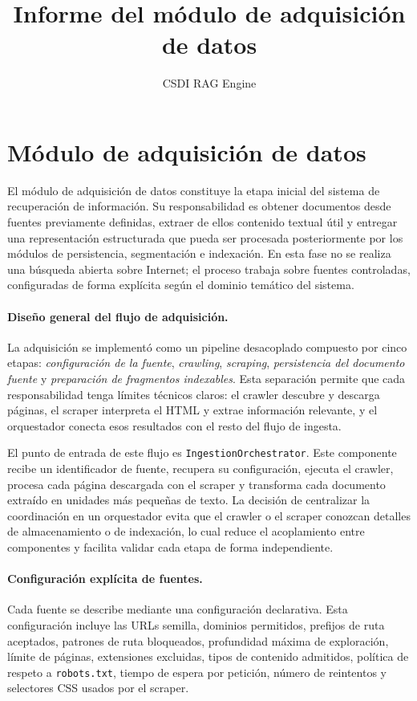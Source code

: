 \documentclass[11pt]{article}
\title{Informe del módulo de adquisición de datos}
\author{CSDI RAG Engine}
\date{}
\begin{document}
\maketitle

\section{Módulo de adquisición de datos}

El módulo de adquisición de datos constituye la etapa inicial del sistema de recuperación de
información. Su responsabilidad es obtener documentos desde fuentes previamente definidas,
extraer de ellos contenido textual útil y entregar una representación estructurada que pueda ser
procesada posteriormente por los módulos de persistencia, segmentación e indexación. En esta
fase no se realiza una búsqueda abierta sobre Internet; el proceso trabaja sobre fuentes
controladas, configuradas de forma explícita según el dominio temático del sistema.

\paragraph{Diseño general del flujo de adquisición.}
La adquisición se implementó como un pipeline desacoplado compuesto por cinco etapas:
\emph{configuración de la fuente}, \emph{crawling}, \emph{scraping}, \emph{persistencia del
documento fuente} y \emph{preparación de fragmentos indexables}. Esta separación permite que
cada responsabilidad tenga límites técnicos claros: el crawler descubre y descarga páginas, el
scraper interpreta el HTML y extrae información relevante, y el orquestador conecta esos
resultados con el resto del flujo de ingesta.

El punto de entrada de este flujo es \texttt{IngestionOrchestrator}. Este componente recibe un
identificador de fuente, recupera su configuración, ejecuta el crawler, procesa cada página
descargada con el scraper y transforma cada documento extraído en unidades más pequeñas de
texto. La decisión de centralizar la coordinación en un orquestador evita que el crawler o el
scraper conozcan detalles de almacenamiento o de indexación, lo cual reduce el acoplamiento
entre componentes y facilita validar cada etapa de forma independiente.

\paragraph{Configuración explícita de fuentes.}
Cada fuente se describe mediante una configuración declarativa. Esta configuración incluye las
URLs semilla, dominios permitidos, prefijos de ruta aceptados, patrones de ruta bloqueados,
profundidad máxima de exploración, límite de páginas, extensiones excluidas, tipos de contenido
admitidos, política de respeto a \texttt{robots.txt}, tiempo de espera por petición, número de
reintentos y selectores CSS usados por el scraper.
\end{document}
